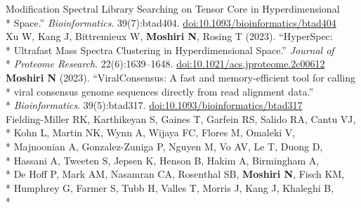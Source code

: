 \documentclass[margin,line]{res}
\begin{document}
\begin{resume}
\hspace*{9.5mm} Modification Spectral Library Searching on Tensor Core in Hyperdimensional\\*\vspace{2mm}
\hspace*{8mm} Space.'' \textit{Bioinformatics}. 39(7):btad404. \href{https://doi.org/10.1093/bioinformatics/btad404}{doi:10.1093/bioinformatics/btad404}\\
\hspace*{4mm} Xu W, Kang J, Bittremieux W, \textbf{Moshiri N}, Rosing T (2023). ``HyperSpec:\\*
\hspace*{9.5mm} Ultrafast Mass Spectra Clustering in Hyperdimensional Space.'' \textit{Journal of}\\*\vspace{2mm}
\hspace*{8mm} \textit{Proteome Research}. 22(6):1639--1648. \href{https://doi.org/10.1021/acs.jproteome.2c00612}{doi:10.1021/acs.jproteome.2c00612}\\
\hspace*{4mm} \textbf{Moshiri N} (2023). ``ViralConsensus: A fast and memory-efficient tool for calling\\*
\hspace*{9.5mm} viral consensus genome sequences directly from read alignment data.''\\*\vspace{2mm}
\hspace*{8mm} \textit{Bioinformatics}. 39(5):btad317. \href{https://doi.org/10.1093/bioinformatics/btad317}{doi:10.1093/bioinformatics/btad317}\\
\hspace*{4mm} Fielding-Miller RK, Karthikeyan S, Gaines T, Garfein RS, Salido RA, Cantu VJ,\\*
\hspace*{9.5mm} Kohn L, Martin NK, Wynn A, Wijaya FC, Flores M, Omaleki V,\\*
\hspace*{9.5mm} Majnoonian A, Gonzalez-Zuniga P, Nguyen M, Vo AV, Le T, Duong D,\\*
\hspace*{9.5mm} Hassani A, Tweeten S, Jepsen K, Henson B, Hakim A, Birmingham A,\\*
\hspace*{9.5mm} De Hoff P, Mark AM, Nasamran CA, Rosenthal SB, \textbf{Moshiri N}, Fisch KM,\\*
\hspace*{9.5mm} Humphrey G, Farmer S, Tubb H, Valles T, Morris J, Kang J, Khaleghi B,\\*

\end{resume}
\end{document}
